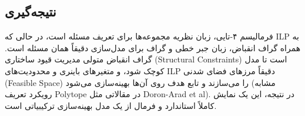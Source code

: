 \documentclass[12pt,a4paper]{article}
\begin{document}
\subsection*{نتیجه‌گیری}
فرمالیسم ۴-تایی، زبان نظریه مجموعه‌ها برای تعریف مسئله است، در حالی که ILP به همراه گراف انقباض، زبان جبر خطی و گراف برای مدل‌سازی دقیقاً همان مسئله است. گراف انقباض متولی مدیریت قیود ساختاری (Structural Constraints) است تا مدل کوچک شود، و متغیرهای باینری و محدودیت‌های ILP دقیقاً مرزهای فضای شدنی (Feasible Space) را می‌سازند و تابع هدف روی آن‌ها بهینه‌سازی می‌شود (مشابه رویکرد تعریف Polytope در مقالاتی مثل Doron-Arad et al). در نتیجه، این یک نمایش کاملاً استاندارد و فرمال از یک مدل بهینه‌سازی ترکیبیاتی است.
\end{document}
